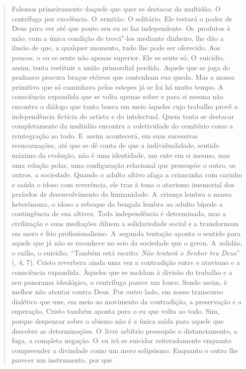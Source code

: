 {\begin{quote}
Falemos primeiramente daquele que quer se destacar da multidão. O
centrífuga por excelência. O~ermitão. O solitário. Ele testará o poder
de Deus para ver até que ponto seu eu se faz independente. Os~produtos à
mão, com a única condição de trocá"-los mediante dinheiro, lhe dão a
ilusão de que, a qualquer momento, tudo lhe pode ser oferecido. Aos
poucos, o eu se sente não apenas superior. Ele se sente só. O~suicídio,
assim, tenta restituir a união primordial perdida. Aquele que se joga do
penhasco procura braços etéreos que contenham sua queda. Mas a massa
primitiva que só caminhava pelas estepes já se foi há muito tempo. A
consciência expandida que se volta apenas sobre e para si mesma não
encontra o diálogo que tanto busca em meio àqueles cujo trabalho provê a
independência fictícia do artista e do intelectual. Quem tenta se
destacar completamente da multidão encontra a coletividade do cemitério
como a reintegração ao todo. E~assim acontecerá, em suas sucessivas
reencarnações, até que se dê conta de que a individualidade, sentido
máximo da evolução, não é uma identidade, um ente em si mesmo, mas uma
relação polar, uma configuração relacional que pressupõe o outro, os
outros, a sociedade. Quando o adulto altivo afaga a criancinha com
carinho e saúda o idoso com reverência, ele traz à tona o atavismo
imemorial dos períodos de desenvolvimento da humanidade. A~criança
lembra a massa heterônoma, o idoso a reboque da bengala lembra ao adulto
bípede a contingência de sua altivez. Toda independência é determinada,
mas a civilização e suas mediações diluem a solidariedade social e a
transformam em mero e frio profissionalismo. A~segunda tentação aponta o
sentido para aquele que já não se reconhece no seio da sociedade que o
gerou. A~solidão, o exílio, o suicídio. ``Também está escrito: \emph{Não
tentará o Senhor teu Deus}'' (, 4, 7). Cristo reverbera ainda uma
vez a contradição entre o atavismo e a consciência expandida. Àqueles
que se moldam à divisão do trabalho e a seu panorama ideológico, o
centrífuga parece um louco. Sendo assim, é melhor não atentar contra
Deus. Por outro lado, em nosso transcurso dialético que une, em meio ao
movimento da contradição, a preservação e a superação, Cristo também
aponta para o eu que volta ao todo. Sim, porque despencar sobre o abismo
não é a única saída para aquele que descobre as determinações. O~livre
arbítrio pressupõe o distanciamento, a fuga, a completa negação. O~eu
irá se suicidar reiteradamente enquanto compreender a divindade como um
mero solipsismo. Enquanto o outro lhe parecer um instrumento, por que

\end{quote}}
